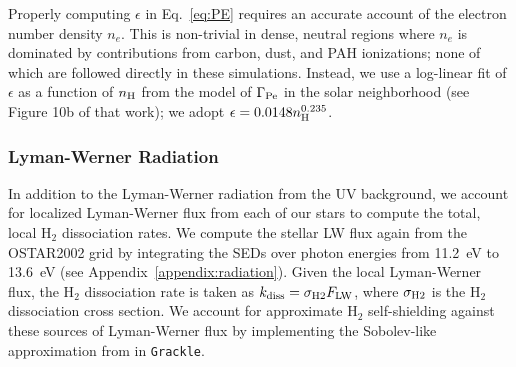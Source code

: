 \documentclass[twocolumn]{aastex61}
\begin{document}
Properly computing $\epsilon$ in Eq.~\ref{eq:PE} requires an accurate account of the electron number density $n_e$. This is non-trivial in dense, neutral regions where $n_e$ is dominated by contributions from carbon, dust, and PAH ionizations; none of which are followed directly in these simulations. Instead, we use a log-linear fit of $\epsilon$ as a function of $n_{\rm H}$ from the \citet{Wolfire2003} model of $\Gamma_{\rm{Pe}}$ in the solar neighborhood (see Figure 10b of that work); we adopt $\epsilon = 0.0148n_{\rm{H}}^{0.235}$. %

\subsubsection{Lyman-Werner Radiation}
\label{sec:LW}
In addition to the Lyman-Werner radiation from the UV background, we account for localized Lyman-Werner flux from each of our stars to compute the total, local H$_2$ dissociation rates. We compute the stellar LW flux again from the OSTAR2002 grid by integrating the SEDs over photon energies from 11.2~eV to 13.6~eV (see Appendix~\ref{appendix:radiation}). Given the local Lyman-Werner flux, the H$_2$ dissociation rate is taken as $k_{\rm diss} = \sigma_{\rm H2} F_{\rm LW}$, where $\sigma_{\rm H2}$ is the H$_2$ dissociation cross section. We account for approximate H$_2$ self-shielding against these sources of Lyman-Werner flux by implementing the Sobolev-like approximation from \citet{Wolcott-Green2011} in \texttt{Grackle}. 

%
%
\end{document}
